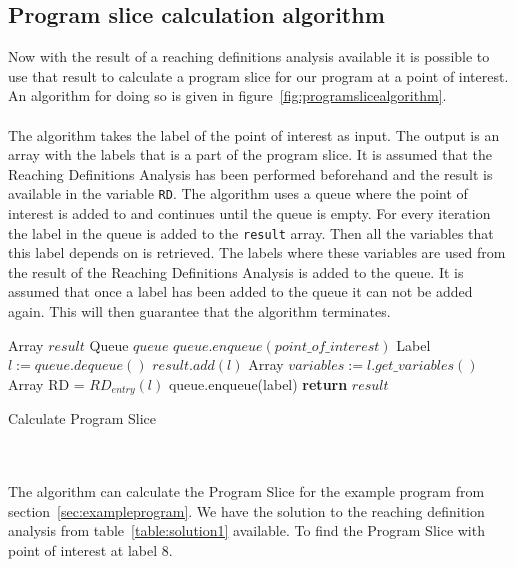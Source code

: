 \subsection{Program slice calculation algorithm}
Now with the result of a reaching definitions analysis available it is possible to use that result to calculate a program slice for our program at a point of interest. An algorithm for doing so is given in figure~\ref{fig:programslicealgorithm}.
\\
\\
The algorithm takes the label of the point of interest as input. The output is an array with the labels that is a part of the program slice. It is assumed that the Reaching Definitions Analysis has been performed beforehand and the result is available in the variable \texttt{RD}. The algorithm uses a queue where the point of interest is added to and continues until the queue is empty. For every iteration the label in the queue is added to the \texttt{result} array. Then all the variables that this label depends on is retrieved. The labels where these variables are used from the result of the Reaching Definitions Analysis is added to the queue. It is assumed that once a label has been added to the queue it can not be added again. This will then guarantee that the algorithm terminates.
\begin{algorithm}
 \begin{algorithmic}[1]
 \State Array $result$
 \State Queue $queue$
 \State $queue.enqueue(point\_of\_interest)$
 \State Label $l:=queue.dequeue()$
 \State $result.add(l)$
 \State Array $variables:=l.get\_variables()$
 \State Array RD = $RD_{entry}(l)$
\State queue.enqueue(label)
\EndIf 
\EndFor
 \EndWhile
 \State \textbf{return} $result$
 \EndProcedure
 \end{algorithmic}
 \caption{Calculate Program Slice}
 \label{fig:programslicealgorithm}
\end{algorithm}
\\\\
The algorithm can calculate the Program Slice for the example program from section~\ref{sec:exampleprogram}. We have the solution to the reaching definition analysis from table~\ref{table:solution1} available. To find the Program Slice with point of interest at label 8.

